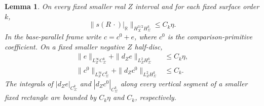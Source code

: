 \documentclass[11pt]{amsart}
\newtheorem{lemma}[theorem]{Lemma}
\theoremstyle{definition}
\theoremstyle{remark}
\theoremstyle{plain}
\newcommand{\RR}{\mathbb{R}}
\begin{document}
\begin{lemma}\label{lem:converse-critical-trace}
On every fixed smaller real $Z$ interval and for each fixed surface
order $k$,
\begin{equation}\label{eq:converse-critical-trace}
              \|s(R\,\cdot)|_{\RR}\|_{H_X^{3/2}H_\Sigma^k}
                                                 \leq C_k\eta.
\end{equation}
In the base-parallel frame write $c=c^0+e$, where $c^0$ is the
comparison-primitive coefficient. On a fixed smaller negative $Z$
half-disc,
\begin{equation}\label{eq:converse-large-coefficients}
\begin{split}
 \|e\|_{L_Z^\infty C_\Sigma^k}
       +\|d_Ze\|_{L_Z^2H_\Sigma^k}&\leq C_k\eta,\\
 \|c^0\|_{L_Z^\infty C_\Sigma^k}
       +\|d_Zc^0\|_{L_Z^2H_\Sigma^k}&\leq C_k.
\end{split}
\end{equation}
The integrals of $|d_Ze|_{C_\Sigma^k}$ and
$|d_Zc^0|_{C_\Sigma^k}$ along every vertical segment of a
smaller fixed rectangle are bounded by $C_k\eta$ and $C_k$,
respectively.
\end{lemma}
\end{document}
